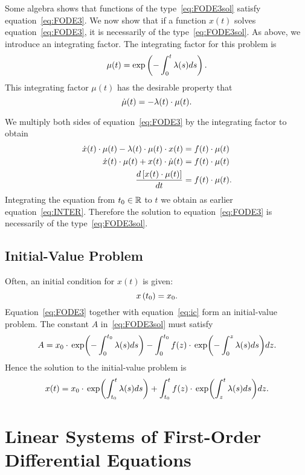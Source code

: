 \documentclass[letterpaper,12pt,leqno]{article}
\begin{document}
Some algebra shows that functions of the type~\eqref{eq:FODE3sol} satisfy equation~\eqref{eq:FODE3}. We now show that if a function $x(t)$ solves equation~\eqref{eq:FODE3}, it is necessarily of the type~\eqref{eq:FODE3sol}. As above, we introduce an integrating factor. The integrating factor for this problem is
\begin{equation*}
\mu(t) =\exp \bp{-\int_{0}^{t}\l(s) ds}.
\end{equation*}
This integrating factor $\mu(t)$ has the desirable property that 
\[\dot{\mu}(t) =-\lambda(t) \cdot \mu(t).\]

We multiply both sides of equation~\eqref{eq:FODE3} by the integrating factor to obtain
\begin{align*}
\dot{x}(t) \cdot \mu(t) -\lambda(t) \cdot  \mu(t) \cdot x(t)& =f(t) \cdot \mu(t)\\
\dot{x}(t) \cdot\mu(t) +x(t) \cdot \dot{\mu}(t) &=f(t)\cdot \mu(t)\\
\frac{d \left[ x(t) \cdot \mu(t) \right]}{d t}& =f(t) \cdot\mu(t).
\end{align*}
Integrating the equation from $t_{0}\in \mathbb{R}$ to $t$ we obtain as earlier equation~\eqref{eq:INTER}. Therefore the solution to equation~\eqref{eq:FODE3} is necessarily of the type~\eqref{eq:FODE3sol}.

\subsection{Initial-Value Problem}

Often, an initial condition for $x(t) $ is given:
\begin{equation}
x\left( t_{0} \right) =x_{0}.  \label{eq:ic}
\end{equation}
Equation~\eqref{eq:FODE3} together with equation~\eqref{eq:ic} form an initial-value problem. The constant $A$ in~\eqref{eq:FODE3sol} must satisfy
\[A=x_{0}\cdot \exp{-\int_{0}^{t_{0}}\l(s)ds}-\int_{0}^{t_{0}}f(z) \cdot \exp{-\int_{0}^{z}\l(s)ds} dz.\]
Hence the solution to the initial-value problem is
\begin{equation}
x(t) =x_{0}\cdot \exp{\int_{t_{0}}^{t}\l(s)ds}+\int_{t_{0}}^{t}f(z)\cdot \exp{\int_{z}^{t}\l(s)ds}dz.\label{eq:icsol}
\end{equation}

\section{Linear Systems of First-Order Differential Equations}\label{sec:two}
\end{document}
